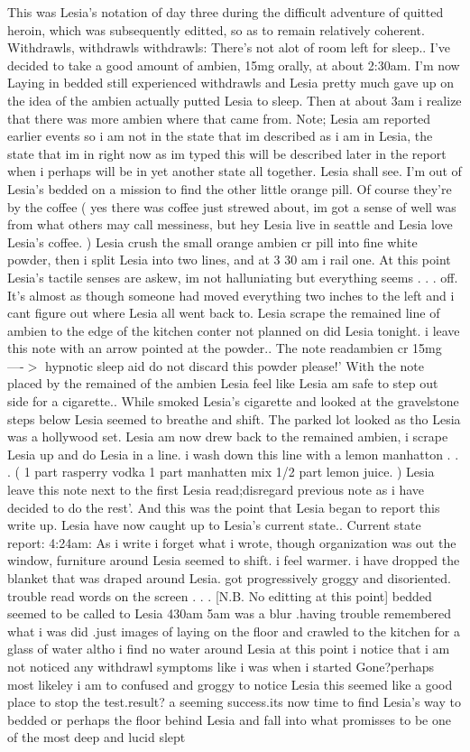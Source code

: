 \documentclass[12pt]{book}
\begin{document}
This was Lesia's notation of day three during the difficult adventure of quitted heroin, which was subsequently editted, so as to remain relatively coherent. Withdrawls, withdrawls withdrawls: There's not alot of room left for sleep.. I've decided to take a good amount of ambien, 15mg orally, at about 2:30am. I'm now Laying in bedded still experienced withdrawls and Lesia pretty much gave up on the idea of the ambien actually putted Lesia to sleep. Then at about 3am i realize that there was more ambien where that came from. Note; Lesia am reported earlier events so i am not in the state that im described as i am in Lesia, the state that im in right now as im typed this will be described later in the report when i perhaps will be in yet another state all together. Lesia shall see. I'm out of Lesia's bedded on a mission to find the other little orange pill. Of course they're by the coffee ( yes there was coffee just strewed about, im got a sense of well was from what others may call messiness, but hey Lesia live in seattle and Lesia love Lesia's coffee. ) Lesia crush the small orange ambien cr pill into fine white powder, then i split Lesia into two lines, and at 3 30 am i rail one. At this point Lesia's tactile senses are askew, im not halluniating but everything seems . . .  off. It's almost as though someone had moved everything two inches to the left and i cant figure out where Lesia all went back to. Lesia scrape the remained line of ambien to the edge of the kitchen conter not planned on did Lesia tonight. i leave this note with an arrow pointed at the powder.. The note readambien cr 15mg ----$>$ hypnotic sleep aid do not discard this powder please!' With the note placed by the remained of the ambien Lesia feel like Lesia am safe to step out side for a cigarette.. While smoked Lesia's cigarette and looked at the gravelstone steps below Lesia seemed to breathe and shift. The parked lot looked as tho Lesia was a hollywood set. Lesia am now drew back to the remained ambien, i scrape Lesia up and do Lesia in a line. i wash down this line with a lemon manhatton  . . .  ( 1 part rasperry vodka 1 part manhatten mix 1/2 part lemon juice. ) Lesia leave this note next to the first Lesia read;disregard previous note as i have decided to do the rest'. And this was the point that Lesia began to report this write up. Lesia have now caught up to Lesia's current state.. Current state report: 4:24am: As i write i forget what i wrote, though organization was out the window, furniture around Lesia seemed to shift. i feel warmer. i have dropped the blanket that was draped around Lesia. got progressively groggy and disoriented. trouble read words on the screen . . .  [N.B. No editting at this point] bedded seemed to be called to Lesia 430am 5am was a blur .having trouble remembered what i was did .just images of laying on the floor and crawled to the kitchen for a glass of water altho i find no water around Lesia at this point i notice that i am not noticed any withdrawl symptoms like i was when i started Gone?perhaps most likeley i am to confused and groggy to notice Lesia this seemed like a good place to stop the test.result? a seeming success.its now time to find Lesia's way to bedded or perhaps the floor behind Lesia and fall into what promisses to be one of the most deep and lucid slept 
\end{document}
